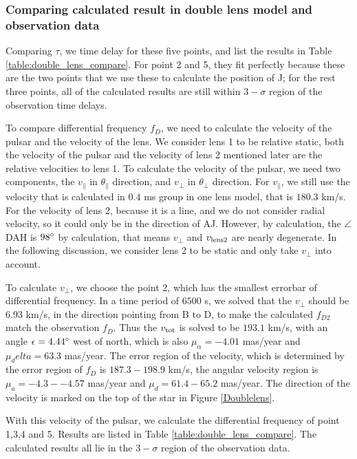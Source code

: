 \documentclass[useAMS,usenatbib]{mn2e}
\begin{document}
\subsubsection{Comparing calculated result in double lens model and observation data}
Comparing $\tau$, we time delay for these five points, and list the results in Table \ref{table:double_lens_compare}. For point 2 and 5, they fit perfectly because these are the two points that we use these to calculate the position of J; for the rest three points, all of the calculated results are still within $3-\sigma$ region of the observation time delays.

To compare differential frequency $f_D$, we need to calculate the velocity of the pulsar and the velocity of the lens. We consider lens 1 to be relative static, both the velocity of the pulsar and the velocity of lens 2 mentioned later are the relative velocities to lens 1.
To calculate the velocity of the pulsar, we need two components, the $v_{\parallel}$ in $\theta_{\parallel}$ direction, and $v_{\bot}$ in $\theta_{\bot}$ direction. For $v_{\parallel}$, we still use the velocity that is calculated in $0.4$ ms group in one lens model, that is $180.3$ km/s. For the velocity of lens 2, because it is a line, and we do not consider radial velocity, so it could only be in the direction of AJ. However, by calculation, the $\angle$DAH is $98\degree$ by calculation, that means $v_{\bot}$ and $v_{\rm lens2}$ are nearly degenerate. In the following discussion, we consider lens 2 to be static and only take $v_{\bot}$ into account.

To calculate $v_{\bot}$, we choose the point 2, which has the smallest errorbar of differential frequency. In a time period of $6500$ s, we solved that the $v_{\bot}$ should be $6.93$ km/s, in the direction pointing from B to D, to make the calculated $f_{D2}$ match the observation $f_D$. Thus the $v_{\rm tot}$ is solved to be $193.1$ km/s, with an angle $\epsilon=4.44\degree$ west of north, which is also $\mu_\alpha=-4.01$ mas/year and $\mu_delta=63.3$ mas/year. The error region of the velocity, which is determined by the error region of $f_D$ is $187.3-198.9$ km/s, the angular velocity region is $\mu_a=-4.3--4.57$ mas/year and $\mu_d=61.4-65.2$ mas/year. The direction of the velocity is marked on the top of the star in Figure \ref{Doublelens}.

With this velocity of the pulsar, we calculate the differential frequency of point 1,3,4 and 5. Results are listed in Table \ref{table:double_lens_compare}. The calculated results all lie in the $3-\sigma$ region of the observation data. 
\end{document}
